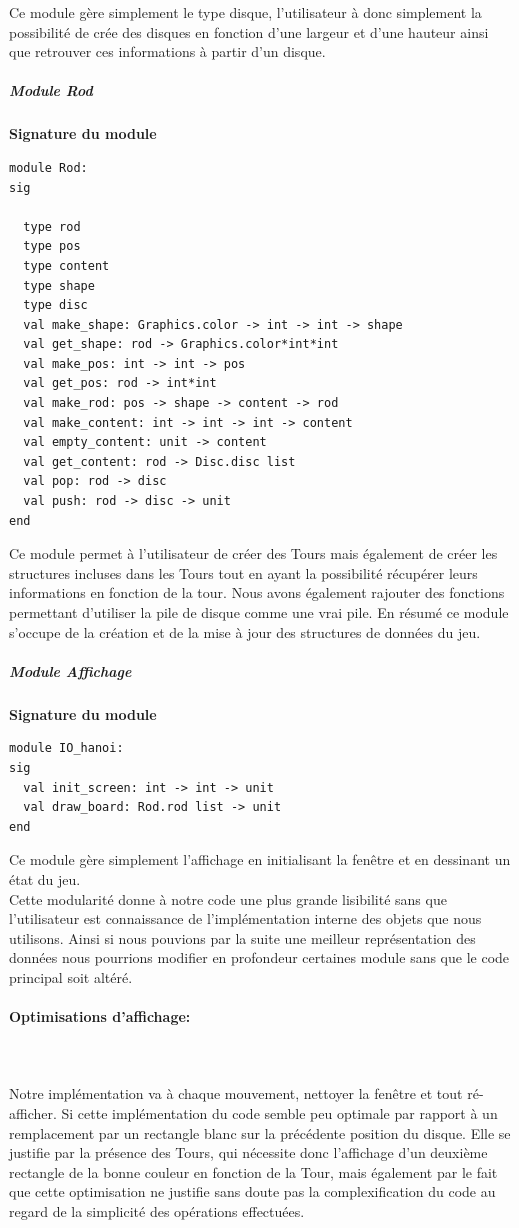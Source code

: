 \documentclass[a4paper,11pt]{article}
\begin{document}
Ce module gère simplement le type disque, l'utilisateur à donc simplement la possibilité de crée des disques en fonction d'une largeur et d'une hauteur ainsi que retrouver ces informations à partir d'un disque.

\subparagraph{Module Rod}
\begin{center}
\textbf{Signature du module}
\begin{lstlisting}
module Rod:
sig
  
  type rod
  type pos
  type content
  type shape
  type disc
  val make_shape: Graphics.color -> int -> int -> shape
  val get_shape: rod -> Graphics.color*int*int
  val make_pos: int -> int -> pos
  val get_pos: rod -> int*int
  val make_rod: pos -> shape -> content -> rod
  val make_content: int -> int -> int -> content
  val empty_content: unit -> content
  val get_content: rod -> Disc.disc list
  val pop: rod -> disc
  val push: rod -> disc -> unit    
end
\end{lstlisting}
\end{center}
Ce module permet à l'utilisateur de créer des Tours mais également de créer les structures incluses dans les Tours tout en ayant la possibilité récupérer leurs informations en fonction de la tour.
Nous avons également rajouter des fonctions permettant d'utiliser la pile de disque comme une vrai pile.
En résumé ce module s'occupe de la création et de la mise à jour des structures de données du jeu.

\subparagraph{Module Affichage}
\begin{center}
\textbf{Signature du module}
\begin{lstlisting}
module IO_hanoi:
sig
  val init_screen: int -> int -> unit
  val draw_board: Rod.rod list -> unit
end
\end{lstlisting}
\end{center}
Ce module gère simplement l'affichage en initialisant la fenêtre et en dessinant un état du jeu.
\\
Cette modularité donne à notre code une plus grande lisibilité sans que l'utilisateur est connaissance de l'implémentation interne des objets que nous utilisons.
Ainsi si nous pouvions par la suite une meilleur représentation des données nous pourrions modifier en profondeur certaines module sans que le code principal soit altéré.


\paragraph{Optimisations d'affichage:}\mbox{}\\\\
Notre implémentation va à chaque mouvement, nettoyer la fenêtre et tout ré-afficher.
Si cette implémentation du code semble peu optimale par rapport à un remplacement par un rectangle blanc sur la précédente position du disque.
Elle se justifie par la présence des Tours, qui nécessite donc l'affichage d'un deuxième rectangle de la bonne couleur en fonction de la Tour, mais également par le fait que cette optimisation ne justifie sans doute pas la complexification du code au regard de la simplicité des opérations effectuées.
\end{document}
